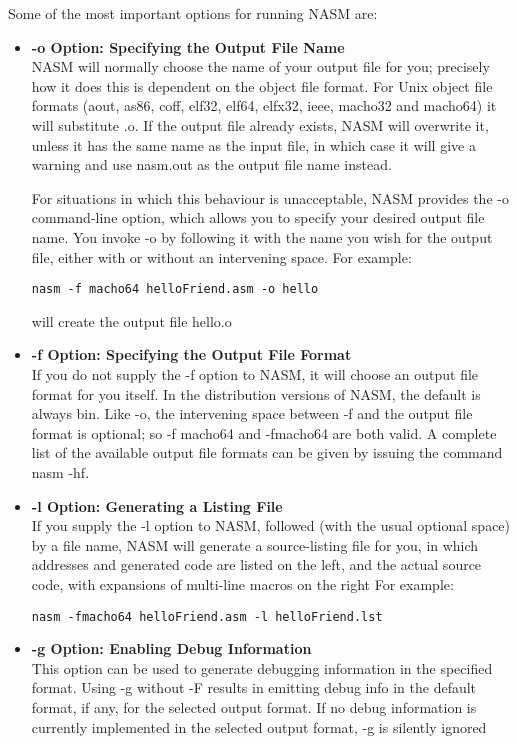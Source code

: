 Some of the most important options for running NASM are:
\begin{itemize}
\item \textbf{-o Option: Specifying the Output File Name} \\
NASM will normally choose the name of your output file for you; precisely how it does this is dependent on the object file format. For Unix object file formats (aout, as86, coff, elf32, elf64, elfx32, ieee, macho32 and macho64) it will substitute .o. If the output file already exists, NASM will overwrite it, unless it has the same name as the input file, in which case it will give a warning and use nasm.out as the output file name instead.

For situations in which this behaviour is unacceptable, NASM provides the -o command-line option, which allows you to specify your desired output file name. You invoke -o by following it with the name you wish for the output file, either with or without an intervening space. For example:
\begin{verbatim}
nasm -f macho64 helloFriend.asm -o hello
\end{verbatim}
will create the output file hello.o

\item \textbf{-f Option: Specifying the Output File Format} \\
If you do not supply the -f option to NASM, it will choose an output file format for you itself. In the distribution versions of NASM, the default is always bin. Like -o, the intervening space between -f and the output file format is optional; so -f macho64 and -fmacho64 are both valid. A complete list of the available output file formats can be given by issuing the command nasm -hf.

\item \textbf{-l Option: Generating a Listing File} \\
If you supply the -l option to NASM, followed (with the usual optional space) by a file name, NASM will generate a source-listing file for you, in which addresses and generated code are listed on the left, and the actual source code, with expansions of multi-line macros on the right For example:
\begin{verbatim}
nasm -fmacho64 helloFriend.asm -l helloFriend.lst
\end{verbatim}

\item \textbf{-g Option: Enabling Debug Information} \\
This option can be used to generate debugging information in the specified format. Using -g without -F results in emitting debug info in the default format, if any, for the selected output format. If no debug information is currently implemented in the selected output format, -g is silently
ignored
\end{itemize}